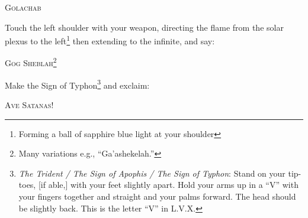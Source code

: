 \begin{quoting}
\textsc{Golachab}
\end{quoting}

Touch the left shoulder with your weapon, directing the flame from the solar plexus to the left\footnote{Forming a ball of sapphire blue light at your shoulder} then extending to the infinite, and say:

\begin{quoting}
\textsc{Gog Sheblah}\footnote{Many variations e.g., \enquote{Ga'ashekelah.}}
\end{quoting}

Make the Sign of Typhon\footnote{\textit{The Trident / The  Sign of Apophis / The Sign of Typhon}: Stand on your tip-toes, [if able,] with your feet slightly apart. Hold your arms up in a \enquote{V} with your fingers together and straight and your palms forward. The head should be slightly back. This is the letter \enquote{V} in L.V.X.} and exclaim:

\begin{quoting}
\textsc{Ave Satanas!}
\end{quoting}


